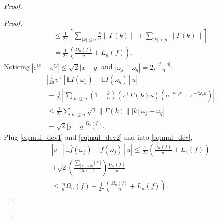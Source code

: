 \begin{proof}
\begin{proof}
\begin{equation}
\begin{aligned}
&\le \frac{1}{2\pi} \left [\sum_{|k|\le n} \frac{k}{n}  \|\Gamma(k)\|+ \sum_{|k|>n}\|\Gamma(k)\|\right]\\
&= \frac{1}{2\pi}\left(\frac{\Omega_n(f)}{n} + L_n(f)\right).
\end{aligned}
\end{equation}
Noticing $|e^{ix} - e^{iy}|\le \sqrt{2} |x-y|$ and $|\omega_j-\omega_q| = 2\pi \frac{|j-q|}{n}$, 
\begin{equation}
\label{eq:mul_dev2}
\begin{aligned}
&\left|\frac{1}{2\pi} v^\top \left[\mathbb{E} I(\omega_j) - \mathbb{E} I(\omega_q) \right]u\right| \\
&= \frac{1}{2\pi}\left|\sum_{|k|\le n} \left(1-\frac{k}{n}\right) (v^\top \Gamma(k)u) (e^{-i\omega_jk} - e^{-i\omega_qk})\right|\\
&\le \frac{1}{2\pi} \sum_{|k|\le n} \sqrt{2} \|\Gamma(k)\| |k||\omega_j - \omega_q| \\
&= \sqrt{2} |j-q| \frac{\Omega_n(f)}{n}. 
\end{aligned}
\end{equation}
Plug \eqref{eq:mul_dev1} and \eqref{eq:mul_dev2} and into \eqref{eq:mul_dev},  
\begin{equation}
\begin{aligned}
&\left|v^\top \left[\mathbb{E}\hat{f}(\omega_j) - f(\omega_j)\right]u\right| \le \frac{1}{2\pi}\left(\frac{\Omega_n(f)}{n} + L_n(f)\right)\\
&+\sqrt{2} \left(\frac{\sum_{|\ell|\le m} |\ell|}{2m+1}\right)\frac{\Omega_n(f)}{n}\\
&\le \frac{m}{n}\Omega_n(f) + \frac{1}{2\pi}\left(\frac{\Omega_n(f)}{n}+L_n(f)\right).
\end{aligned}
\end{equation}
\end{proof}



\end{proof}
